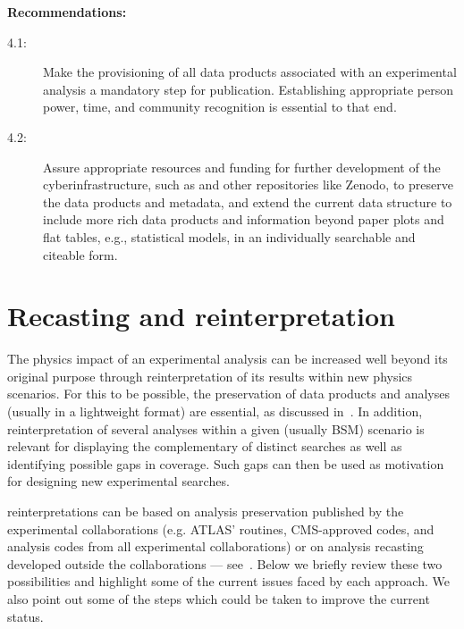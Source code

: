 \documentclass[11pt]{article}
\begin{document}
\noindent
\textbf{Recommendations:}
\begin{description}
   \item[4.1:] Make the provisioning of all data products associated with an experimental analysis a mandatory step for publication.
   Establishing appropriate person power, time, and community recognition is essential to that end.
   \item[4.2:] Assure appropriate resources and funding for further development of the cyberinfrastructure, such as \hepdata and other repositories like Zenodo, to preserve the data products and metadata, and extend the current data structure to include more rich data products and information beyond paper plots and flat tables, e.g., statistical models, in an individually searchable and citeable form.
\end{description}





\section{Recasting and reinterpretation}
\label{reinterpret}

The physics impact of an experimental analysis can be increased well beyond its original purpose through \gls{reinterpretation} of its results within new physics scenarios.
For this to be possible, the preservation of data products and analyses (usually in a lightweight format) are essential, as discussed in~.
In addition, reinterpretation of several analyses within a given (usually \gls{BSM}) scenario is relevant for displaying the complementary of distinct searches as well as identifying possible gaps in coverage.
Such gaps can then be used as motivation for designing new experimental searches.


\Glspl{reinterpretation} can be based on \gls{analysis preservation} published by the experimental collaborations (e.g. ATLAS' \simpleanalysis routines, \gls{CMS}-approved \madanalysis codes, and \rivet analysis codes from all experimental collaborations) or on analysis recasting developed outside the collaborations --- see~. Below we briefly review these two possibilities and highlight some of the current issues faced by each approach.
We also point out some of the steps which could be taken to improve the current status.
\end{document}
